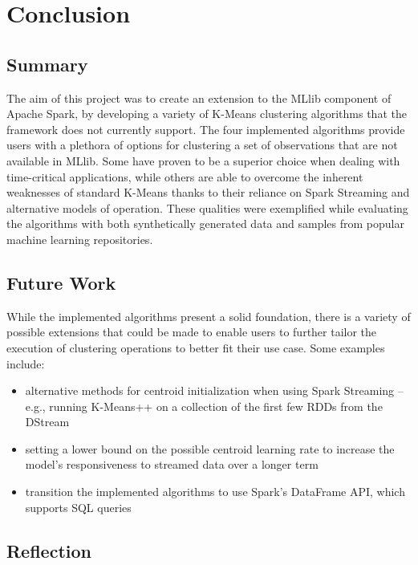 \documentclass{l4proj}
\begin{document}
\chapter{Conclusion}
\label{conclusion}

\section{Summary}

The aim of this project was to create an extension to the MLlib component of Apache Spark, by developing a variety of K-Means clustering algorithms that the framework does not currently support. The four implemented algorithms provide users with a plethora of options for clustering a set of observations that are not available in MLlib. Some have proven to be a superior choice when dealing with time-critical applications, while others are able to overcome the inherent weaknesses of standard K-Means thanks to their reliance on Spark Streaming and alternative models of operation. These qualities were exemplified while evaluating the algorithms with both synthetically generated data and samples from popular machine learning repositories.

\section{Future Work}

While the implemented algorithms present a solid foundation, there is a variety of possible extensions that could be made to enable users to further tailor the execution of clustering operations to better fit their use case. Some examples include:

\begin{itemize}
\item alternative methods for centroid initialization when using Spark Streaming -- e.g., running K-Means++ on a collection of the first few RDDs from the DStream
\item setting a lower bound on the possible centroid learning rate to increase the model's responsiveness to streamed data over a longer term
\item transition the implemented algorithms to use Spark's DataFrame API, which supports SQL queries
\end{itemize}

\section{Reflection}
\end{document}
